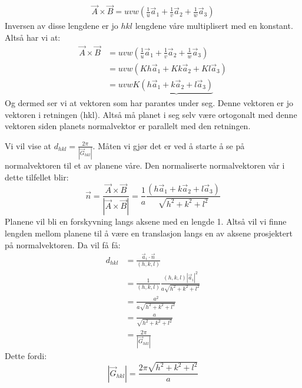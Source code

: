 \documentclass{article}
\begin{document}
\begin{align}
    \vec{A} \times \vec{B} = uvw( \frac{1}{u} \vec{a}_1+\frac{1}{v} \vec{a}_2+\frac{1}{w} \vec{a}_3)
\end{align}
Inversen av disse lengdene er jo $hkl$ lengdene våre multiplisert med en konstant. Altså har vi at:
\begin{align}
    \vec{A} \times \vec{B} &= uvw( \frac{1}{u} \vec{a}_1+\frac{1}{v} \vec{a}_2+\frac{1}{w} \vec{a}_3) \\
    &= uvw( Kh \vec{a}_1+Kk \vec{a}_2+Kl \vec{a}_3)\\
    &= uvw K\underbrace{( h \vec{a}_1+k \vec{a}_2+l \vec{a}_3)}
\end{align}
Og dermed ser vi at vektoren som har parantes under seg. Denne vektoren er jo vektoren i retningen (hkl). Altså må planet i seg selv være ortogonalt med denne vektoren siden planets normalvektor er parallelt med den retningen.

Vi vil vise at $d_{hkl} = \frac{2\pi}{|\vec{G}_{hkl}|}$. Måten vi gjør det er ved å starte å se på normalvektoren til et av planene våre. Den normaliserte normalvektoren vår i dette tilfellet blir:
\begin{equation}
    \vec{n}= \frac{ \vec{A} \times \vec{B}}{| \vec{A} \times \vec{B}|} = \frac{1}{a} \frac{( h \vec{a}_1+k \vec{a}_2+l \vec{a}_3)}{\sqrt{h^2 + k^2 + l^2}}
\end{equation}
Planene vil bli en forskyvning langs aksene med en lengde 1. Altså vil vi finne lengden mellom planene til å være en translasjon langs en av aksene prosjektert på  normalvektoren. Da vil få få:
\begin{align}
    d_{hkl} &= \frac{\vec{a}_i \cdot \vec{n}}{(h, k, l)} \\
    &= \frac{1}{(h, k, l)} \frac{(h, k, l) |\vec{a}_i|^2}{a \sqrt{h^2 + k^2 + l^2}} \\
    &= \frac{a^2}{a\sqrt{h^2 + k^2 + l^2}} \\
    &= \frac{a}{\sqrt{h^2 + k^2 + l^2}} \\
    &= \frac{2 \pi}{|\vec{G}_{hkl}|}
\end{align}
Dette fordi:
\begin{equation}
     |\vec{G}_{hkl}| = \frac{ 2 \pi \sqrt{h^2 + k^2 + l^2}}{a}
\end{equation}
\end{document}
